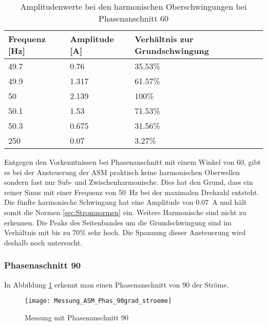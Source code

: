 \begin{table}[ht!]
	\centering
	\begin{tabular}{|l|l|l|}
		\hline
		Frequenz {[}Hz{]} & Amplitude {[}A{]} & Verhältnis zur Grundschwingung	\\ \hline
		49.7              & 0.76              & 35.53\%							\\ \hline
		49.9              & 1.317             & 61.57\%							\\ \hline
		50                & 2.139             & 100\%							\\ \hline
		50.1              & 1.53              & 71.53\%							\\ \hline
		50.3              & 0.675             & 31.56\%							\\ \hline
		250               & 0.07              & 3.27\%							\\ \hline
	\end{tabular}
	\caption{Amplitudenwerte bei den harmonischen Oberschwingungen bei Phasenanschnitt 60\textdegree}\label{tab:Phas_60_ASM_stroeme}
\end{table}
Entgegen den Vorkenntnissen bei Phasenanschnitt mit einem Winkel von 60\textdegree, gibt es bei der Ansteuerung der ASM praktisch keine harmonischen Oberwellen sondern fast nur Sub- und Zwischenharmonische. Dies hat den Grund, dass ein reiner Sinus mit einer Frequenz von \SI{50}{Hz} bei der maximalen Drehzahl entsteht. Die fünfte harmonische Schwingung hat eine Amplitude von \SI{0.07}{A} und hält somit die Normen \ref{sec:Stromnormen} ein. Weitere Harmonische sind nicht zu erkennen. Die Peaks des Seitenbandes um die Grundschwingung sind im Verhältnis mit bis zu 70\% sehr hoch. Die Spannung dieser Ansteuerung wird deshalb noch untersucht.


\subsubsection*{Phasenaschnitt 90\textdegree}

In Abbildung \ref{fig:Mess_Phas_90grad_stroeme} erkennt man einen Phasenanschnitt von 90\textdegree \hspace{0.02cm} der Ströme.

\begin{figure}[ht!]
	\centering
	\texttt{[image: Messung\_ASM\_Phas\_90grad\_stroeme]}	
	\caption{Messung mit Phasenanschnitt 90\textdegree}\label{fig:Mess_Phas_90grad_stroeme}
\end{figure}


